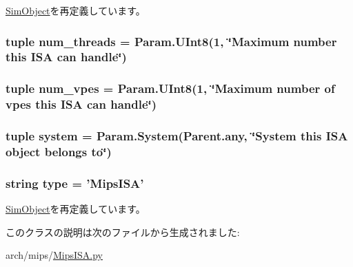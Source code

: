 \hyperlink{classm5_1_1SimObject_1_1SimObject_a17da7064bc5c518791f0c891eff05fda}{SimObject}を再定義しています。\hypertarget{classMipsISA_1_1MipsISA_a6bede2fa1bbaab86a4a39115b97b8301}{
\subsubsection[{num\_\-threads}]{\setlength{\rightskip}{0pt plus 5cm}tuple {\bf num\_\-threads} = Param.UInt8(1, \char`\"{}Maximum number this {\bf ISA} can handle\char`\"{})}}
\label{classMipsISA_1_1MipsISA_a6bede2fa1bbaab86a4a39115b97b8301}
\hypertarget{classMipsISA_1_1MipsISA_a7a2e9716e2e035df60402d7ecad5f580}{
\subsubsection[{num\_\-vpes}]{\setlength{\rightskip}{0pt plus 5cm}tuple {\bf num\_\-vpes} = Param.UInt8(1, \char`\"{}Maximum number of vpes this {\bf ISA} can handle\char`\"{})}}
\label{classMipsISA_1_1MipsISA_a7a2e9716e2e035df60402d7ecad5f580}
\hypertarget{classMipsISA_1_1MipsISA_ab737471139f5a296e5b26e8a0e1b0744}{
\subsubsection[{system}]{\setlength{\rightskip}{0pt plus 5cm}tuple {\bf system} = Param.System(Parent.any, \char`\"{}System this {\bf ISA} object belongs to\char`\"{})}}
\label{classMipsISA_1_1MipsISA_ab737471139f5a296e5b26e8a0e1b0744}
\hypertarget{classMipsISA_1_1MipsISA_acce15679d830831b0bbe8ebc2a60b2ca}{
\subsubsection[{type}]{\setlength{\rightskip}{0pt plus 5cm}string {\bf type} = '{\bf MipsISA}'}}
\label{classMipsISA_1_1MipsISA_acce15679d830831b0bbe8ebc2a60b2ca}


\hyperlink{classm5_1_1SimObject_1_1SimObject_acce15679d830831b0bbe8ebc2a60b2ca}{SimObject}を再定義しています。

このクラスの説明は次のファイルから生成されました:\begin{DoxyCompactItemize}
\item 
arch/mips/\hyperlink{MipsISA_8py}{MipsISA.py}\end{DoxyCompactItemize}
